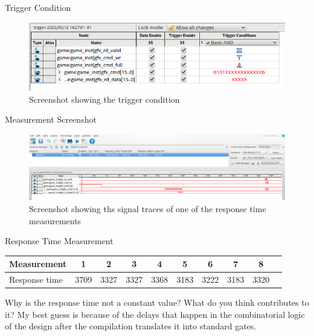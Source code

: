 \documentclass[10pt,a4paper,titlepage,oneside]{article}
\begin{document}


\begin{qa}{Trigger Condition}
	\begin{figure}[h!]
		\centering
		\includegraphics[width=1.0\linewidth]{trigger_condition.png}
		\caption{Screenshot showing the trigger condition}
	\end{figure}
\end{qa}

\begin{qa}{Measurement Screenshot}
	\begin{figure}[h!]
		\centering
		\includegraphics[width=1.0\linewidth]{traces.png}
		\caption{Screenshot showing ths signal traces of one of the response time measurements}
	\end{figure}
\end{qa}

\begin{qa}{Response Time Measurement}
\begin{center}
\begin{tabular}{|l|c|c|c|c|c|c|c|c|c|}
	\hline
	Measurement   & 1 & 2 & 3 & 4 & 5 & 6 & 7 & 8\\\hline
	Response time & 3709 & 3327 & 3327 & 3368 & 3183 & 3222 & 3183 & 3320 \\\hline
\end{tabular}
\end{center}
\end{qa}


\begin{qa}{Why is the response time not a constant value? What do you think contributes to it?}
	My best guess is because of the delays that happen in the combinatorial logic of the design after the compilation translates it into standard gates.
\end{qa}
\end{document}
